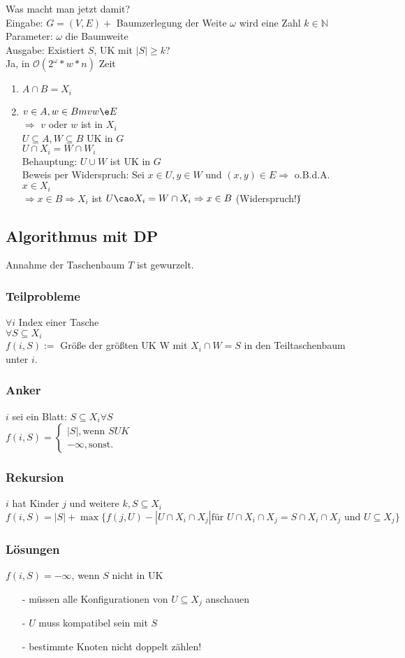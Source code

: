 Was macht man jetzt damit?\\
Eingabe: $G = (V,E) + $ Baumzerlegung der Weite $\omega$ wird eine Zahl $k \in \mathbb{N}$\\
Parameter: $\omega$ die Baumweite\\
Ausgabe: Existiert $S$, UK mit $|S| \geq k$?\\
Ja, in $\mathcal{O}(2^\omega * w * n)$ Zeit\\
\begin{enumerate}
\item $A \cap	B = X_i$
\item $v \in A, w \in Bm vw \e E $\\
$\Rightarrow$ $v$ oder $w$ ist in $X_i$\\
$U \subseteq A, W \subseteq B$ UK in $G$\\
$U \cap X_i = W \cap W_i$\\
Behauptung: $U \cup W$ ist UK in $G$\\
Beweis per Widerspruch: Sei $x \in U, y \in W$ und $(x,y) \in E \Rightarrow $ o.B.d.A. $x \in X_i$\\
$\Rightarrow x \in B \Rightarrow X_i $ ist $U \cao X_i = W \cap X_i \Rightarrow x \in B$ (Widerspruch!)\|
\end{enumerate}

\subsection{Algorithmus mit DP}
Annahme der Taschenbaum $T$ ist gewurzelt.
\subsubsection{Teilprobleme}
$\forall i $ Index einer Tasche\\
$\forall S \subseteq X_i$\\
$f(i,S) := $ Größe der größten UK W mit $X_i \cap W =S$ in den Teiltaschenbaum unter $i$.\\
\subsubsection{Anker}
$i$ sei ein Blatt: $S \subseteq X_i \forall S$\\
$f(i,S) = \begin{cases}
|S|, \text{wenn } S UK\\
-\infty, \text{sonst}.
\end{cases} $
\subsubsection{Rekursion}
$i$ hat Kinder $j$ und weitere $k, S \subseteq X_i$\\
$f(i,S) = |S| + \max \{f(j,U) - |U \cap X_i \cap X_j| \text{für } U\cap X_i \cap X_j = S \cap X_i \cap X_j \text{ und } U \subseteq X_j \}$
\subsubsection{Lösungen}
$f(i,S) = -\infty$, wenn $S$ nicht in UK
\begin{enumerate}
\item[-] müssen alle Konfigurationen von $U \subseteq X_j$ anschauen
\item[-] $U$ muss kompatibel sein mit $S$
\item[-] bestimmte Knoten nicht doppelt zählen!
\end{enumerate}